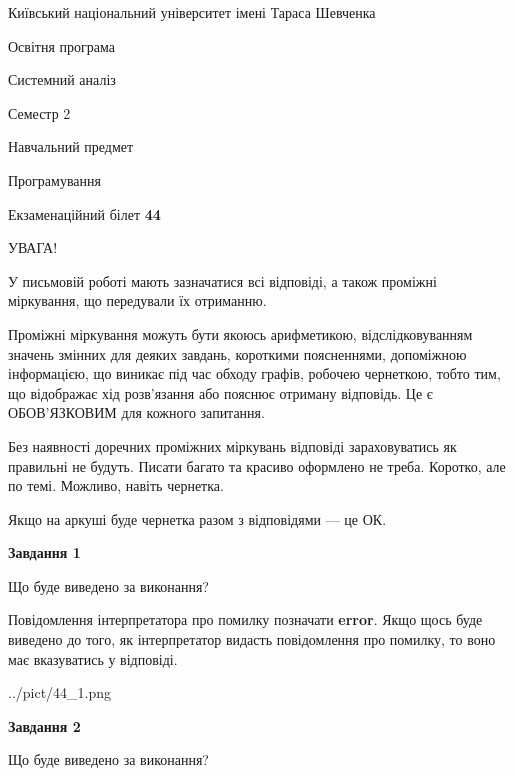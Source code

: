 \documentclass[12pt, ukrainian]{article}
\begin{document}
{{\begin {small}\par
{ \center  Київський національний університет імені Тараса Шевченка \par}
{\parbox {5 cm}{Освітня програма \hfill}{\parbox {7 cm}{Системний аналіз \hfill}}\parbox {6 cm}{\hfill Семестр 2}}\par
{\parbox {5 cm} {Навчальний предмет \hfill}\parbox {7 cm}{Програмування \hfill}\parbox {6cm}{\hfill}\par}\vspace{-7pt} \end{small}}{\center Екзаменаційний білет \No \textbf
{ 44 }\par}}
{
\begin {large}
УВАГА!

У письмовій роботі мають зазначатися всі відповіді, а також проміжні міркування, що передували їх отриманню.

Проміжні міркування можуть бути якоюсь арифметикою, відслідковуванням зна\-чень змінних для деяких завдань,
короткими поясненнями, допоміжною інформацією, що виникає під час обходу графів, робочею чернеткою,
тобто тим, що відображає хід розв’язання або пояснює отриману відповідь.
Це є ОБОВ’ЯЗКОВИМ для кожного запитання.

Без наявності доречних проміжних міркувань відповіді зараховуватись як правиль\-ні не будуть.
Писати багато та красиво оформлено не треба. Коротко, але по темі. Можли\-во, навіть чернетка.

Якщо на аркуші буде чернетка разом з відповідями --- це ОК.

\newpage

{\begin {center}\textbf{Завдання 1}\end {center}}\par
Що буде виведено за виконання?

Повідомлення інтерпретатора про помилку позначати \textbf{error}.
Якщо щось буде виведено до того, як інтерпретатор видасть повідомлення про помилку, 
то воно має вказуватись у відповіді. \par


\begin{center}
	{../pict/44_1.png}
\end{center}
\newpage

{\begin {center}\textbf{Завдання 2}\end {center}}\par
Що буде виведено за виконання?


\end{large}}
\end{document}
